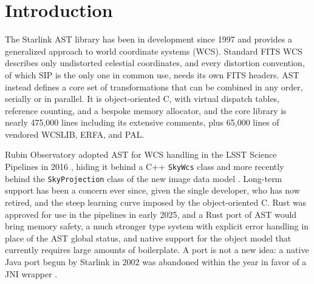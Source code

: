 \documentclass[11pt,twoside]{article}
\begin{document}

\section{Introduction}

The Starlink AST library \citep{1998ASPC..145...41W,2016A&C....15...33B} has been in development since 1997 and provides a generalized approach to world coordinate systems (WCS).
Standard FITS WCS \citep{2002A&A...395.1077C} describes only undistorted celestial coordinates, and every distortion convention, of which SIP \citep{2005ASPC..347..491S} is the only one in common use, needs its own FITS headers.
AST instead defines a core set of transformations that can be combined in any order, serially or in parallel.
It is object-oriented C, with virtual dispatch tables, reference counting, and a bespoke memory allocator, and the core library is nearly 475,000 lines including its extensive comments, plus 65,000 lines of vendored WCSLIB, ERFA, and PAL.

Rubin Observatory adopted AST for WCS handling in the LSST Science Pipelines in 2016 \citep{DMTN-010}, hiding it behind a C++ \texttt{SkyWcs} class and more recently behind the \texttt{SkyProjection} class of the new image data model \citep{2026SPIE14155E..17B}.
Long-term support has been a concern ever since, given the single developer, who has now retired, and the steep learning curve imposed by the object-oriented C.
Rust was approved for use in the pipelines in early 2025, and a Rust port of AST would bring memory safety, a much stronger type system with explicit error handling in place of the AST global status, and native support for the object model that currently requires large amounts of boilerplate.
A port is not a new idea: a native Java port begun by Starlink in 2002 \citep{2003ASPC..295..445B} was abandoned within the year in favor of a JNI wrapper \citep{2004ASPC..314..412B}.
\end{document}

